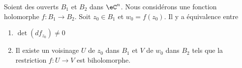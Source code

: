 \begin{theorem}       \label{THOooNBGZooHuGtxW}
	Soient des ouverts \( B_1\) et \( B_2\) dans \( \eC^n\). Nous considérons une fonction holomorphe \( f\colon B_1\to B_2\). Soit \( z_0\in B_1\) et \( w_0=f(z_0)\). Il y a équivalence entre
	\begin{enumerate}
		\item
		      \( \det(df_{z_0})\neq 0\)
		\item
		      Il existe un voisinage \( U\) de \( z_0\) dans \( B_1\) et \( V\) de \( w_0\) dans \( B_2\) tels que la restriction \( f\colon U\to V\) est biholomorphe.
	\end{enumerate}
\end{theorem}
